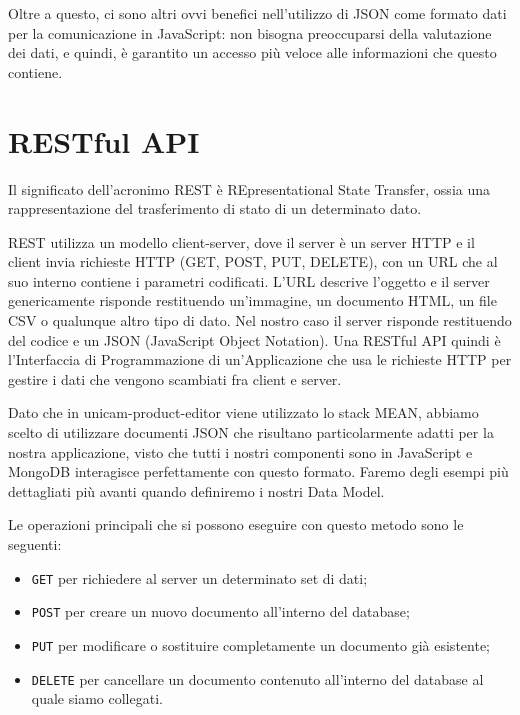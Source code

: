 Oltre a questo, ci sono altri ovvi benefici nell'utilizzo di JSON come formato dati per la comunicazione in JavaScript: non bisogna preoccuparsi della valutazione dei dati, e quindi, è garantito un accesso più veloce alle informazioni che questo contiene.



\section{RESTful API}
Il significato dell’acronimo REST è REpresentational State Transfer, ossia una rappresentazione del trasferimento di stato di un determinato dato.

REST utilizza un modello client-server, dove il server è un server HTTP e il client invia richieste HTTP (GET, POST, PUT, DELETE), con un URL che al suo interno contiene i parametri codificati. L'URL descrive l'oggetto e il server genericamente risponde restituendo un'immagine, un documento HTML, un file CSV o qualunque altro tipo di dato.
Nel nostro caso il server risponde restituendo del codice e un JSON (JavaScript Object Notation).
Una RESTful API quindi è l'Interfaccia di Programmazione di un'Applicazione che usa le richieste HTTP per gestire i dati che vengono scambiati fra client e server.

Dato che in unicam-product-editor viene utilizzato lo stack MEAN, abbiamo scelto di utilizzare documenti JSON che risultano particolarmente adatti per la nostra applicazione, visto che tutti i nostri componenti sono in JavaScript e MongoDB\cite{mongodb} interagisce perfettamente con questo formato. 
Faremo degli esempi più dettagliati più avanti quando definiremo i nostri Data Model.

Le operazioni principali che si possono eseguire con questo metodo sono le seguenti:
\begin{itemize}
	\item\texttt{GET} per richiedere al server un determinato set di dati;
	\item\texttt{POST} per creare un nuovo documento all’interno del database;
	\item\texttt{PUT} per modificare o sostituire completamente un documento già esistente;
	\item\texttt{DELETE} per cancellare un documento contenuto all’interno del database al quale siamo collegati. 
\end{itemize}

